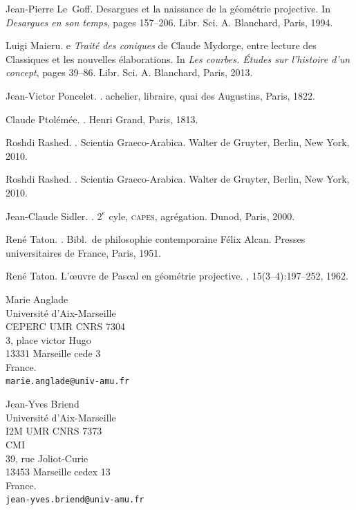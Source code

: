 \documentclass[12pt, a4paper]{article}
\begin{document}
\begin{thebibliography}{10}
Jean-Pierre Le~Goff.
\newblock Desargues et la naissance de la g\'eom\'etrie projective.
\newblock In {\em Desargues en son temps}, pages 157--206. Libr. Sci. A.
  Blanchard, Paris, 1994.

Luigi Maieru.
e \emph{{T}rait{\'e} des coniques} de {C}laude {M}ydorge, entre
  lecture des {C}lassiques et les nouvelles {\'e}laborations.
\newblock In {\em Les courbes. {\'E}tudes sur l'histoire d'un concept}, pages
  39--86. Libr. Sci. A. Blanchard, Paris, 2013.

Jean-Victor Poncelet.
.
achelier, libraire, quai des {A}ugustins, {P}aris, 1822.

Claude Ptol{\'e}m{\'e}e.
.
\newblock Henri {G}rand, {P}aris, 1813.

Roshdi Rashed.
.
\newblock Scientia Graeco-Arabica. Walter de Gruyter, Berlin, New York, 2010.

Roshdi Rashed.
.
\newblock Scientia Graeco-Arabica. Walter de Gruyter, Berlin, New York, 2010.

Jean-{C}laude Sidler.
.
\newblock $2^e$ cyle, \textsc{capes}, agr{\'e}gation. Dunod, {P}aris, 2000.

Ren{\'e} Taton.
.
\newblock Bibl.~de philosophie contemporaine F{\'e}lix Alcan. Presses
  universitaires de France, Paris, 1951.

Ren{\'e} Taton.
\newblock L'{\oe}uvre de {P}ascal en g{\'e}om{\'e}trie projective.
,
  15(3--4):197--252, 1962.



\end{thebibliography}

\noindent Marie Anglade \\
Université d'Aix-Marseille\\
CEPERC UMR CNRS 7304\\
3, place victor Hugo\\
13331 Marseille cede 3\\
France. \\
\verb=marie.anglade@univ-amu.fr=


\noindent Jean-Yves Briend \\
Université d'Aix-Marseille\\
I2M UMR CNRS 7373\\
CMI\\
39, rue Joliot-Curie\\
13453 Marseille cedex 13\\
France.\\
\verb=jean-yves.briend@univ-amu.fr=
\end{document}
